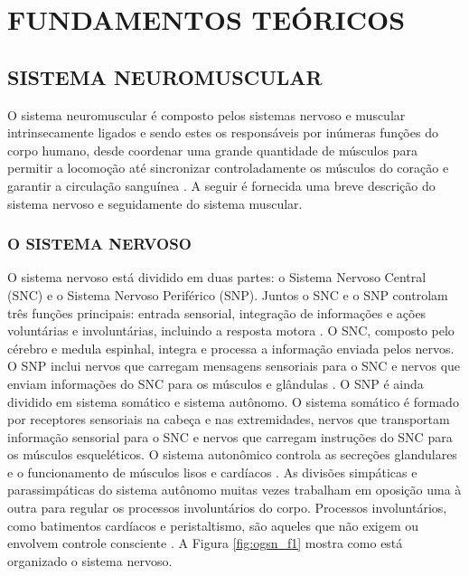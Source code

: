 \chapter{FUNDAMENTOS TEÓRICOS}
\label{sec:cap2}


\section{SISTEMA NEUROMUSCULAR}

O sistema neuromuscular é composto pelos sistemas nervoso e muscular intrinsecamente ligados e sendo estes os responsáveis por inúmeras funções do corpo humano, desde coordenar uma grande quantidade de músculos para permitir a locomoção até sincronizar controladamente os músculos do coração e garantir a circulação sanguínea \cite{Moore2014AnatomiaClinica}. A seguir é fornecida uma breve descrição do sistema nervoso e seguidamente do sistema muscular.

\subsection{O SISTEMA NERVOSO}

O sistema nervoso está dividido em duas partes: o Sistema Nervoso Central (\acrshort{SNC}) e o Sistema Nervoso Periférico (\acrshort{SNP}). Juntos o \acrshort{SNC} e o \acrshort{SNP} controlam três funções principais: entrada sensorial, integração de informações e ações voluntárias e involuntárias, incluindo a resposta motora \cite{Benjamin1978EncyclopediaHealth}. O \acrshort{SNC}, composto pelo cérebro e medula espinhal, integra e processa a informação enviada pelos nervos. O \acrshort{SNP} inclui nervos que carregam mensagens sensoriais para o \acrshort{SNC} e nervos que enviam informações do \acrshort{SNC} para os músculos e glândulas \cite{Gerard2010TheSystem}. O \acrshort{SNP} é ainda dividido em sistema somático e sistema autônomo. O sistema somático é formado por receptores sensoriais na cabeça e nas extremidades, nervos que transportam informação sensorial para o \acrshort{SNC} e nervos que carregam instruções do \acrshort{SNC} para os músculos esqueléticos. O sistema autonômico controla as secreções glandulares e o funcionamento de músculos lisos e cardíacos \cite{Mai2012TheSystem}. As divisões simpáticas e parassimpáticas do sistema autônomo muitas vezes trabalham em oposição uma à outra para regular os processos involuntários do corpo. Processos involuntários, como batimentos cardíacos e peristaltismo, são aqueles que não exigem ou envolvem controle consciente \cite{Gerard2010TheSystem}. A Figura \ref{fig:ogsn_f1} mostra como está organizado o sistema nervoso. 

